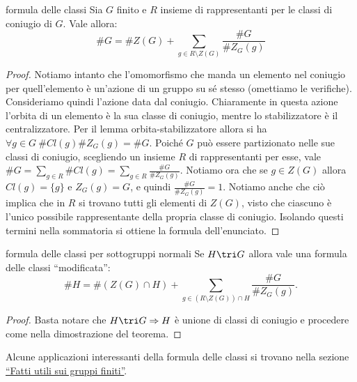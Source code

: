 \begin{theorem}{formula delle classi}
    Sia $G$ finito e $R$ insieme di rappresentanti per le classi di coniugio di $G$. Vale allora:
    \[
    \#G = \#Z(G) + \sum_{g \in R \setminus Z(G)} \frac{\#G}{\#Z_G(g)}
    \]
\end{theorem}
\begin{proof}
    Notiamo intanto che l'omomorfismo che manda un elemento nel coniugio per quell'elemento è un'azione di un gruppo su sé stesso (omettiamo le verifiche). Consideriamo quindi l'azione data dal coniugio. Chiaramente in questa azione l'orbita di un elemento è la sua classe di coniugio, mentre lo stabilizzatore è il centralizzatore. Per il lemma orbita-stabilizzatore allora si ha $\forall g \in G \ \#Cl(g)\#Z_G(g) = \#G$.  Poiché $G$ può essere partizionato nelle sue classi di coniugio, scegliendo un insieme $R$ di rappresentanti per esse, vale $\#G = \sum_{g \in R} \#Cl(g) = \sum_{g \in R} \frac{\#G}{\#Z_G(g)}$. Notiamo ora che se $g \in Z(G)$ allora $Cl(g) = \{g\}$ e $Z_G(g) = G$, e quindi $\frac{\#G}{\#Z_G(g)} = 1$. Notiamo anche che ciò implica che in $R$ si trovano tutti gli elementi di $Z(G)$, visto che ciascuno è l'unico possibile rappresentante della propria classe di coniugio. Isolando questi termini nella sommatoria si ottiene la formula dell'enunciato.
\end{proof}
\begin{corollary}{formula delle classi per sottogruppi normali}
    Se $H \tri G$ allora vale una formula delle classi ``modificata'':
    \[
    \#H = \#(Z(G)\cap H) + \sum_{g \in (R \setminus Z(G)) \cap H} \frac{\#G}{\#Z_G(g)}.
    \]
\end{corollary}
\begin{proof}
    Basta notare che $H \tri G \Rightarrow H$ è unione di classi di coniugio e procedere come nella dimostrazione del teorema.
\end{proof}
Alcune applicazioni interessanti della formula delle classi si trovano nella sezione \hyperlink{gruppi finiti}{``Fatti utili sui gruppi finiti''}.

